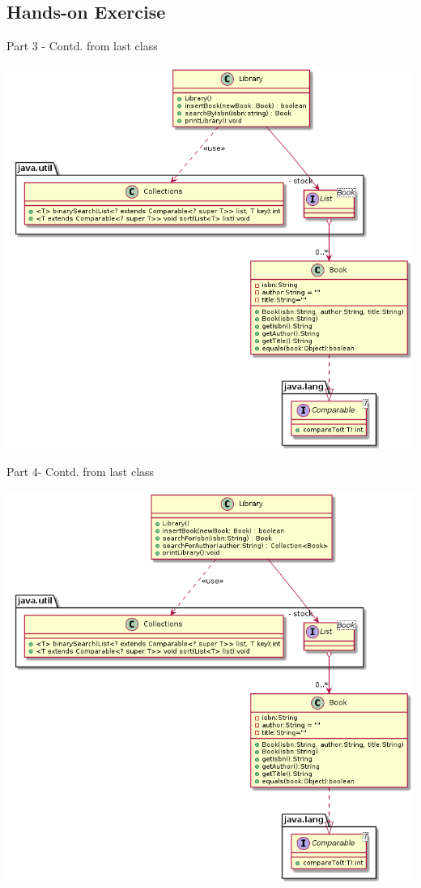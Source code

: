 \subsection {Hands-on Exercise}
	\begin{frame}{Part 3 - Contd. from last class}
		
		\begin{center}
			\includegraphics[scale=.34]{07_collection/hands_on_03.png}
		\end{center}
		
	\end{frame}
	
	\begin{frame}{Part 4- Contd. from last class}
		
		\begin{center}
			\includegraphics[scale=.34]{07_collection/hands_on_04.png}
		\end{center}
		
	\end{frame}	
	
